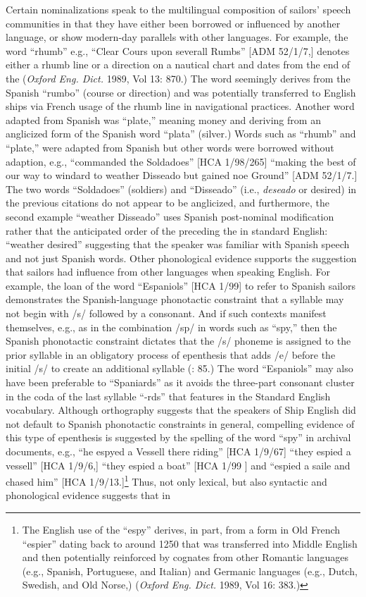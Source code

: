Certain nominalizations speak to the multilingual composition of sailors’ speech communities in that they have either been borrowed or influenced by another language, or show modern-day parallels with other languages. For example, the word “rhumb” e.g., “Clear Cours upon severall Rumbs” [ADM 52/1/7,] denotes either a rhumb line or a direction on a nautical chart and dates from the end of the  (\textit{Oxford Eng. Dict.} 1989, Vol 13: 870.) The word seemingly derives from the Spanish “rumbo” (course or direction) and was potentially transferred to English ships via French usage of the rhumb line in navigational practices. Another word adapted from Spanish was “plate,” meaning money and deriving from an anglicized form of the Spanish word “plata” (silver.) Words such as “rhumb” and “plate,” were adapted from Spanish but other words were borrowed without adaption, e.g., “commanded the Soldadoes” [HCA 1/98/265] “making the best of our way to windard to weather Disseado but gained noe Ground” [ADM 52/1/7.] The two words “Soldadoes” (soldiers) and “Disseado” (i.e., \textit{deseado} or desired) in the previous citations do not appear to be anglicized, and furthermore, the second example “weather Disseado” uses Spanish post-nominal modification rather that the anticipated order of the  preceding the  in standard English: “weather desired” suggesting that the speaker was familiar with Spanish speech and not just Spanish words. Other phonological evidence supports the suggestion that sailors had influence from other languages when speaking English. For example, the loan of the word “Espaniols” [HCA 1/99] to refer to Spanish sailors demonstrates the Spanish-language phonotactic constraint that a syllable may not begin with /s/ followed by a consonant. And if such contexts manifest themselves, e.g., as in the combination /sp/ in words such as “spy,” then the Spanish phonotactic constraint dictates that the /s/ phoneme is assigned to the prior syllable in an obligatory process of epenthesis that adds /e/ before the initial /s/ to create an additional syllable (\citealt{Schnitzer1997}: 85.) The word “Espaniols” may also have been preferable to “Spaniards” as it avoids the three-part consonant cluster in the coda of the last syllable “-rds” that features in the Standard English vocabulary. Although orthography suggests that the speakers of Ship English did not default to Spanish phonotactic constraints in general, compelling evidence of this type of epenthesis is suggested by the spelling of the word “spy” in archival documents, e.g., “he espyed a Vessell there riding” [HCA 1/9/67] “they espied a vessell” [HCA 1/9/6,] “they espied a boat” [HCA 1/99  \citealt{Islands1722}] and “espied a saile and chased him” [HCA 1/9/13.]\footnote{The English use of the  “espy” derives, in part, from a  form in Old French “espier” dating back to around 1250 that was transferred into Middle English and then potentially reinforced by cognates from other Romantic languages (e.g., Spanish, Portuguese, and Italian) and Germanic languages (e.g., Dutch, Swedish, and Old Norse,) (\textit{Oxford Eng. Dict.} 1989, Vol 16: 383.)} Thus, not only lexical, but also syntactic and phonological evidence suggests that  in 